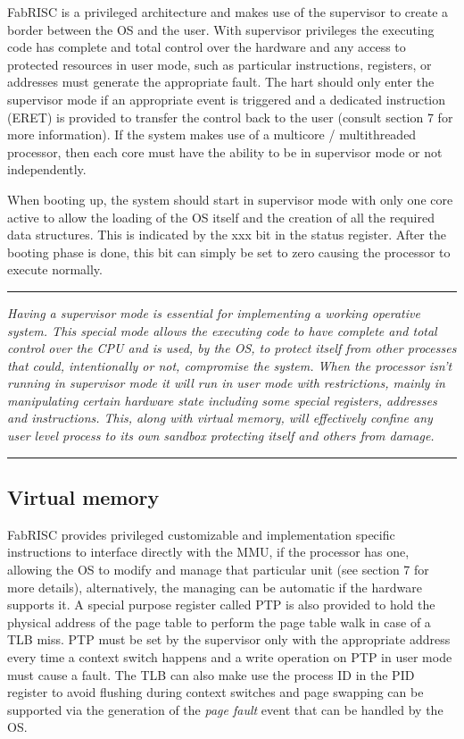 \documentclass{article}
\begin{document}
            FabRISC is a privileged architecture and makes use of the supervisor to create a border between the OS and the user. With supervisor privileges the executing code has complete and total control over the hardware and any access to protected resources in user mode, such as particular instructions, registers, or addresses must generate the appropriate fault. The hart should only enter the supervisor mode if an appropriate event is triggered and a dedicated instruction (ERET) is provided to transfer the control back to the user (consult section 7 for more information). If the system makes use of a multicore / multithreaded processor, then each core must have the ability to be in supervisor mode or not independently.

            \vspace{10pt}

            When booting up, the system should start in supervisor mode with only one core active to allow the loading of the OS itself and the creation of all the required data structures. This is indicated by the xxx bit in the status register. After the booting phase is done, this bit can simply be set to zero causing the processor to execute normally.

        \par\noindent\rule{\textwidth}{0.4pt}
        \textit{Having a supervisor mode is essential for implementing a working operative system. This special mode allows the executing code to have complete and total control over the CPU and is used, by the OS, to protect itself from other processes that could, intentionally or not, compromise the system. When the processor isn't running in supervisor mode it will run in user mode with restrictions, mainly in manipulating certain hardware state including some special registers, addresses and instructions. This, along with virtual memory, will effectively confine any user level process to its own sandbox protecting itself and others from damage.}
        \par\noindent\rule{\textwidth}{0.4pt}

        \subsection{Virtual memory}

            FabRISC provides privileged customizable and implementation specific instructions to interface directly with the MMU, if the processor has one, allowing the OS to modify and manage that particular unit (see section 7 for more details), alternatively, the managing can be automatic if the hardware supports it. A special purpose register called PTP is also provided to hold the physical address of the page table to perform the page table walk in case of a TLB miss. PTP must be set by the supervisor only with the appropriate address every time a context switch happens and a write operation on PTP in user mode must cause a fault. The TLB can also make use the process ID in the PID register to avoid flushing during context switches and page swapping can be supported via the generation of the \textit{page fault} event that can be handled by the OS.
\end{document}
